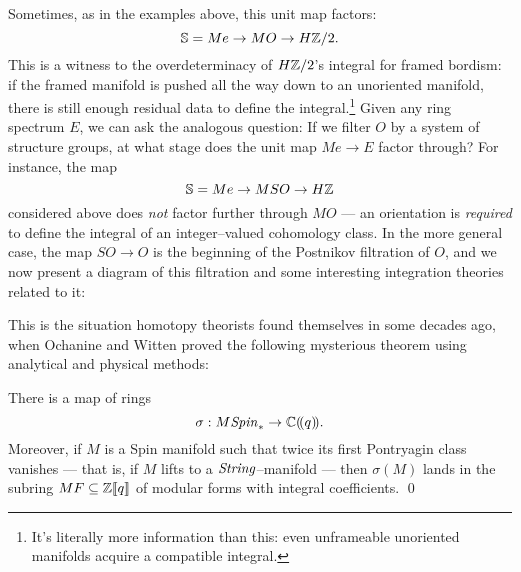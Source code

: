 Sometimes, as in the examples above, this unit map factors: \[\mathbb S = Me \to MO \to H\mathbb Z/2.\]  This is a witness to the overdeterminacy of $H\mathbb Z/2$'s integral for framed bordism: if the framed manifold is pushed all the way down to an unoriented manifold, there is still enough residual data to define the integral.\footnote{It's literally more information than this: even unframeable unoriented manifolds acquire a compatible integral.}  Given any ring spectrum $E$, we can ask the analogous question: If we filter $O$ by a system of structure groups, at what stage does the unit map $Me \to E$ factor through?  For instance, the map \[\mathbb S = Me \to MSO \to H\mathbb Z\] considered above does \emph{not} factor further through $MO$ --- an orientation is \emph{required} to define the integral of an integer--valued cohomology class.  In the more general case, the map $SO \to O$ is the beginning of the Postnikov filtration of $O$,  and we now present a diagram of this filtration and some interesting integration theories related to it:
\begin{center}
\end{center}

This is the situation homotopy theorists found themselves in some decades ago, when Ochanine and Witten proved the following mysterious theorem using analytical and physical methods:

\begin{theorem}
There is a map of rings \[\sigma: M\mathit{Spin}_* \to \mathbb{C}(\!(q)\!).\]  Moreover, if $M$ is a Spin manifold such that twice its first Pontryagin class vanishes --- that is, if $M$ lifts to a $\mathit{String}$--manifold --- then $\sigma(M)$ lands in the subring $MF \subseteq \mathbb Z\llbracket{q}\rrbracket$ of modular forms with integral coefficients. \qed
\end{theorem}

